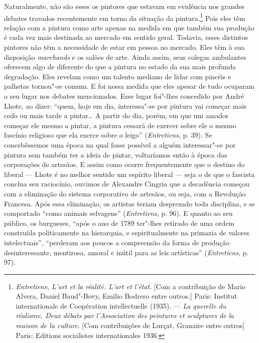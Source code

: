 Naturalmente, não são esses os pintores que estavam em evidência nos
grandes debates travados recentemente em torno da situação da
pintura.\footnote{\emph{Entretiens, L'art et la réalité. L'art et
  l'état}. {[}Com a contribuição de Mario Alvera, Daniel Baud"-Bovy,
  Emilio Bodrero entre outros.{]} Paris: Institut internationale de
  Coopération intellectuelle (1935). --- \emph{La querelle du réalisme.
  Deux débats par l'Association des peintures et sculptures de la maison
  de la culture}. {[}Com contribuições de Lurçat, Granaire entre
  outros{]} Paris: Editions socialistes internationales 1936.} Pois eles
têm relação com a pintura como arte apenas na medida em
que também sua produção é cada vez mais destinada ao mercado em sentido
geral. Todavia, esses distintos pintores não têm a necessidade de estar
em pessoa no mercado. Eles têm à sua disposição \emph{marchands} e os
salões de arte. Ainda assim, seus colegas ambulantes oferecem algo de
diferente do que a pintura no estado da sua mais profunda degradação.
Eles revelam como um talento mediano de lidar com pincéis e palhetas
tornou"-se comum. E foi nessa medida que eles apesar de tudo ocuparam o seu
lugar nos debates mencionados. Esse lugar foi"-lhes concedido por André
Lhote, ao dizer: ``quem, hoje em dia, interessa"-se por pintura vai começar
mais cedo ou mais tarde a pintar\ldots{} A partir do dia, porém, em que um
amador começar ele mesmo a pintar, a pintura cessará de exercer sobre ele o
mesmo fascínio religioso que ela exerce sobre o leigo''
(\emph{Entretiens}, p. 39). Se concebêssemos uma época na qual fosse
possível a alguém interessar"-se por pintura sem também ter a ideia de pintar, voltaríamos então à época das corporações de
artesãos. E assim como ocorre frequentemente que o destino do liberal --- Lhote é
no melhor sentido um espírito liberal --- seja o de que o fascista conclua seu
raciocínio, ouvimos de Alexandre Cingria que a decadência começou com a
eliminação do sistema corporativo de artesãos, ou seja, com a Revolução
Francesa. Após essa eliminação, os artistas teriam desprezado toda
disciplina, e se comportado ``como animais selvagens''
(\emph{Entretiens}, p. 96). E quanto ao seu público, os burgueses,
``após o ano de 1789 ter"-lhes retirado de uma ordem construída
politicamente na hierarquia, e espiritualmente na primazia de valores
intelectuais'', ``perderam aos poucos a compreensão da forma de produção
desinteressante, mentirosa, amoral e inútil para as leis artísticas'' (\emph{Entretiens}, p. 97).

